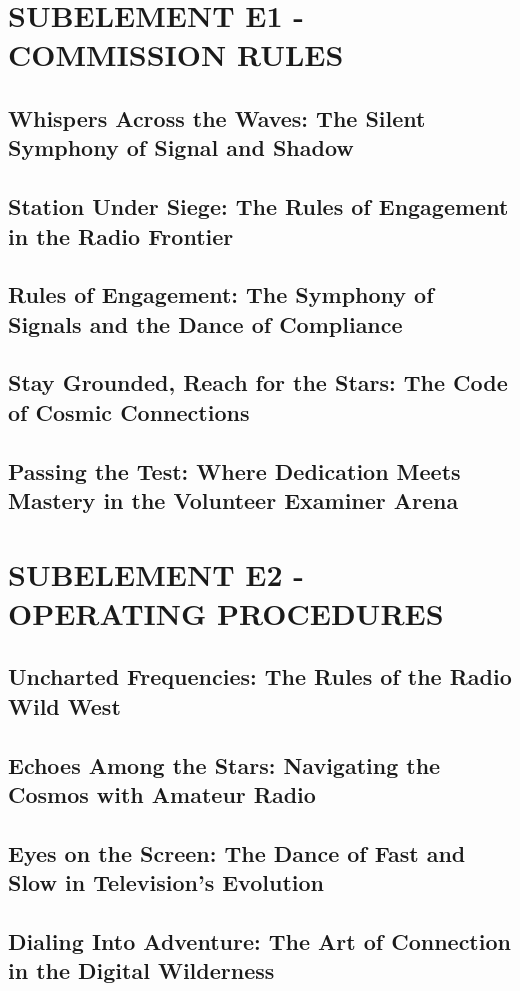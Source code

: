 \documentclass[12pt]{book}
\begin{document}
\tableofcontents
\newpage
\chapter{SUBELEMENT E1 - COMMISSION RULES}
\section{Whispers Across the Waves: The Silent Symphony of Signal and Shadow}
\section{Station Under Siege: The Rules of Engagement in the Radio Frontier}
\section{Rules of Engagement: The Symphony of Signals and the Dance of Compliance}
\section{Stay Grounded, Reach for the Stars: The Code of Cosmic Connections}
\section{Passing the Test: Where Dedication Meets Mastery in the Volunteer Examiner Arena}
\chapter{SUBELEMENT E2 - OPERATING PROCEDURES}
\section{Uncharted Frequencies: The Rules of the Radio Wild West}
\section{Echoes Among the Stars: Navigating the Cosmos with Amateur Radio}
\section{Eyes on the Screen: The Dance of Fast and Slow in Television's Evolution}
\section{Dialing Into Adventure: The Art of Connection in the Digital Wilderness}
\end{document}
